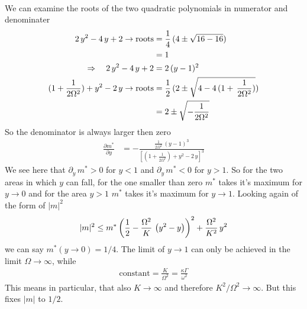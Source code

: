 \documentclass{article}
\begin{document}
\begin{appendices}
\begin{align*}
\end{align*}
We can examine the roots of the two quadratic polynomials in numerator and denominater
\begin{align*}
    2\,{y}^2-4\,{y}+2\rightarrow\text{roots}&=\frac{1}{4}\,(4\pm\sqrt{16-16})\\
    &=1\\
    \Rightarrow\quad 2\,{y}^2-4\,{y}+2&=2\,({y}-1)^2\\
    (1+\frac{1}{2\Omega^2})+{y}^2-2\,{y}\rightarrow\text{roots}&=\frac{1}{2}\,(2\pm\sqrt{4-4\,(1+\,\frac{1}{2\Omega^2})})\\
    &=2\pm\sqrt{-\frac{1}{2\Omega^2}}
\end{align*}
So the denominator is always larger then zero
\begin{align*}
    \frac{\partial m^*}{\partial{y}}&=-\frac{\frac{1}{2\Omega^2}\,({y}-1)^3}{\left[(1+\frac{1}{2\Omega^2})+{y}^2-2\,{y}\right]^3}
\end{align*}
We see here that $\partial_{{y}}\,m^*>0$ for ${y}<1$ and $\partial_{{y}}\,m^*<0$ for ${y}>1$. So for the two areas in which ${y}$ can fall, for the one smaller than zero $m^*$ takes it's maximum for ${y}\rightarrow0$ and for the area ${y}>1$ $m^*$ takes it's maximum for ${y}\rightarrow1$. Looking again of the form of $|m|^2$ 
\begin{align*}
    |m|^2\leq m^*\left( \frac{1}{2}-\frac{\Omega^2}{K}\,\left( {y}^2- {y} \right) \right)^2+\frac{\Omega^2}{K^2}\,{y}^2
\end{align*}
we can say $m^*({y}\rightarrow0)=1/4$. The limit of ${y}\rightarrow1$ can only be achieved in the limit $\Omega\rightarrow\infty$, while%
\begin{align*}
    \text{constant}=\frac{K}{\Omega^2}=\frac{\kappa\Gamma}{\omega^2}
\end{align*}
This means in particular, that also $K\rightarrow\infty$ and therefore $K^2/\Omega^2\rightarrow\infty$. But this fixes $|m|$ to $1/2$. 
\begin{figure}[H]
    \hspace*{-1cm}

\end{figure}
\end{appendices}
\end{document}
